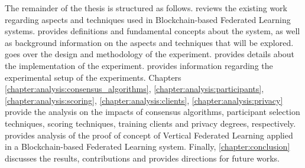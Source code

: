 The remainder of the thesis is structured as follows.  reviews the existing work regarding aspects and techniques used in Blockchain-based Federated Learning systems.  provides definitions and fundamental concepts about the system, as well as background information on the aspects and techniques that will be explored.  goes over the design and methodology of the experiment.  provides details about the implementation of the experiment.  provides information regarding the experimental setup of the experiments. Chapters \ref{chapter:analysis:consensus_algorithms}, \ref{chapter:analysis:participants}, \ref{chapter:analysis:scoring}, \ref{chapter:analysis:clients}, \ref{chapter:analysis:privacy} provide the analysis on the impacts of consensus algorithms, participant selection techniques, scoring techniques, training clients and privacy degrees, respectively.  provides analysis of the proof of concept of Vertical Federated Learning applied in a Blockchain-based Federated Learning system. Finally, \cref{chapter:conclusion} discusses the results, contributions and provides directions for future works.

